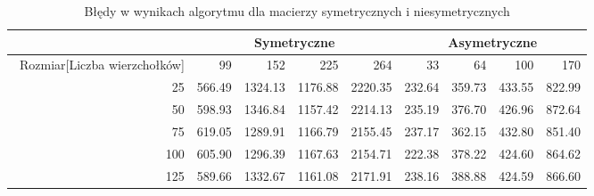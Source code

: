 \begin{table}
\begin{tabular}{|r|r|r|r|r|r|r|r|r|}
\hline
 & \multicolumn{4}{|c|}{Symetryczne} & \multicolumn{4}{|c|}{Asymetryczne} \\ \hline\
Rozmiar[Liczba wierzchołków] & 99 & 152 & 225 & 264 & 33 & 64 & 100 & 170 \\ \hline
25 & 566.49 & 1324.13 & 1176.88 & 2220.35 & 232.64 & 359.73 & 433.55 & 822.99 \\
50 & 598.93 & 1346.84 & 1157.42 & 2214.13 & 235.19 & 376.70 & 426.96 & 872.64 \\
75 & 619.05 & 1289.91 & 1166.79 & 2155.45 & 237.17 & 362.15 & 432.80 & 851.40 \\
100 & 605.90 & 1296.39 & 1167.63 & 2154.71 & 222.38 & 378.22 & 424.60 & 864.62 \\
125 & 589.66 & 1332.67 & 1161.08 & 2171.91 & 238.16 & 388.88 & 424.59 & 866.60 \\ \hline
\end{tabular}
\caption{Błędy w wynikach algorytmu dla macierzy symetrycznych i niesymetrycznych}
\label{tab:error_AnAlpha}
\end{table}
